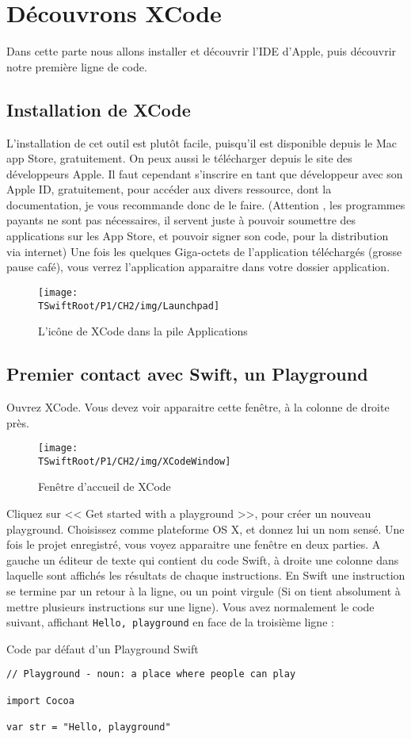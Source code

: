 \chapter{Découvrons XCode}
Dans cette parte nous allons installer et découvrir l'IDE d’Apple, puis découvrir notre
première ligne de code.
\section{Installation de XCode}
L'installation de cet outil est plutôt facile, puisqu’il est disponible depuis le Mac app Store,
gratuitement. On peux aussi le télécharger depuis le site des développeurs Apple. Il faut
cependant s'inscrire en tant que développeur avec son Apple ID, gratuitement, pour
accéder aux divers ressource, dont la documentation,
je vous recommande donc de le faire.
(Attention , les programmes payants ne sont pas nécessaires, il servent juste à pouvoir
soumettre des applications sur les App Store, et pouvoir signer son code, pour la
distribution via internet)
Une fois les quelques Giga-octets de l'application téléchargés (grosse pause café), vous
verrez l'application apparaitre dans votre dossier application.
\begin{figure}[h]
\centering
\texttt{[image: \\TSwiftRoot/P1/CH2/img/Launchpad]}
\caption{L'icône de XCode dans la pile Applications}
\end{figure}

\section{Premier contact avec Swift, un Playground}
Ouvrez XCode. Vous devez voir apparaitre cette fenêtre, à la colonne de droite près.
\begin{figure}[h]
\centering
\texttt{[image: \\TSwiftRoot/P1/CH2/img/XCodeWindow]}
\caption{Fenêtre d'accueil de XCode}
\end{figure}

Cliquez sur << Get started with a playground >>, pour créer un nouveau playground.
Choisissez comme plateforme OS X, et donnez lui un nom sensé.
Une fois le projet enregistré, vous voyez apparaitre une fenêtre en deux parties.
A gauche un éditeur de texte qui contient du code Swift, à droite une colonne dans
laquelle sont affichés les résultats de chaque instructions.
En Swift une instruction se termine par un retour à la ligne, ou un point virgule (Si on tient
absolument à mettre plusieurs instructions sur une ligne).
Vous avez normalement le code suivant, affichant \verb"Hello, playground" en face de la troisième ligne :
\begin{listing}[h]
\caption{Code par défaut d'un Playground Swift}
\begin{verbatim}
// Playground - noun: a place where people can play

import Cocoa

var str = "Hello, playground"
\end{verbatim}
\end{listing}

